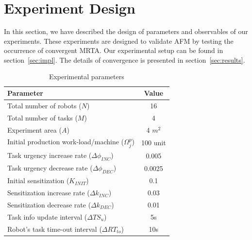 \documentclass{llncs}
\begin{document}
\section{Experiment Design}
\label{sec:expt-design}
In this section, we have described the design of parameters and observables of our experiments.
These experiments are designed to validate AFM by testing the occurrence of convergent MRTA. Our experimental setup can be found in section~\ref{sec:impl}. The details of convergence is presented in section~\ref{sec:results}.
%
\begin{table}
\caption{Experimental parameters}
\label{table:params}
\begin{center}
\begin{tabular}{|l||c|}
\hline Parameter & Value\\
\hline Total number of robots ($N$) & 16\\
\hline Total number of tasks ($M$) & 4\\
\hline Experiment area ($A$) & 4 $m^2$\\
\hline Initial production work-load/machine ($\Omega_{j}^{p}$) & 100 unit\\
\hline Task urgency increase rate ($\Delta\phi_{INC}$) & 0.005\\
\hline Task urgency decrease rate ($\Delta\phi_{DEC}$) & 0.0025\\
\hline Initial sensitization ($K_{INIT}$) & 0.1\\
\hline Sensitization increase rate ($\Delta k_{INC}$) & 0.03\\
\hline Sensitization decrease rate ($\Delta k_{DEC}$) & 0.01\\
\hline Task info update interval ($\Delta TS_{u}$) & 5s\\
\hline Robot's task time-out interval ($\Delta RT_{to} $)& 10s\\
\hline
\end{tabular}
\end{center}
\end{table}
% 
\end{document}
